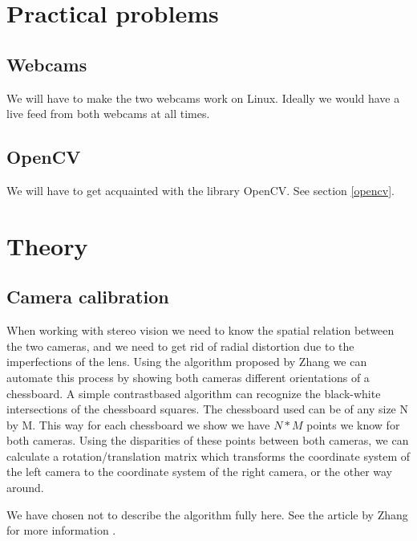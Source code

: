 \documentclass[a4paper]{article}
\begin{document}
\section{Practical problems}

\subsection{Webcams} 
We will have to make the two webcams work on Linux. Ideally we would
have a live feed from both webcams at all times.

\subsection{OpenCV} 
We will have to get acquainted with the library OpenCV. See section
\ref{opencv}.

\section{Theory}

\subsection{Camera calibration}
When working with stereo vision we need to know the spatial relation
between the two cameras, and we need to get rid of radial distortion due to
the imperfections of the lens. Using the algorithm proposed by Zhang
\cite{zhang1999} we can automate this process by showing both cameras
different orientations of a chessboard. A simple contrastbased algorithm
can recognize the black-white intersections of the chessboard squares. The
chessboard used can be of any size N by M. This way for each chessboard we
show we have $N*M$ points we know for both cameras. Using the disparities of
these points between both cameras, we can calculate a rotation/translation
matrix which transforms the coordinate system of the left camera to the
coordinate system of the right camera, or the other way around.

We have chosen not to describe the algorithm fully here. See the article by
Zhang for more information \cite{zhang1999}.
\end{document}
